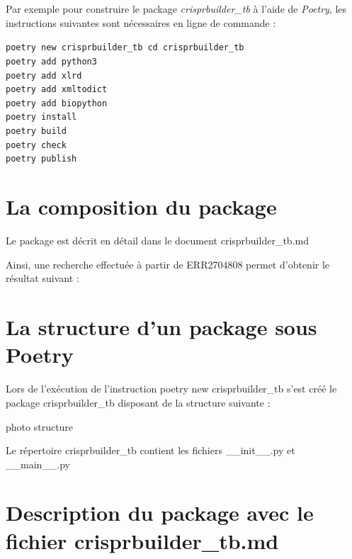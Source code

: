 \documentclass[twoside,a4paper,11pt,frenchb,openany]{report}
\begin{document}
Par exemple pour construire le package \textit{crisprbuilder\_tb} à l'aide de \textit{Poetry}, les instructions suivantes sont nécessaires en ligne de commande :

\begin{tcolorbox}\texttt{poetry new crisprbuilder\_tb
cd crisprbuilder\_tb \\
poetry add python3 \\
poetry add xlrd \\
poetry add xmltodict \\
poetry add biopython \\
poetry install \\
poetry build \\
poetry check \\
poetry publish}\end{tcolorbox}


	
	\section{La composition du package}

Le package est décrit en détail dans le document crisprbuilder\_tb.md


Ainsi, une recherche effectuée à partir de ERR2704808 permet d'obtenir le résultat suivant :


\section{La structure d'un package sous Poetry}

Lors de l'exécution de l'instruction poetry new crisprbuilder\_tb s'est créé le package crisprbuilder\_tb disposant de la structure suivante :

photo structure

Le répertoire crisprbuilder\_tb contient les fichiers \_\_init\_\_.py et \_\_main\_\_.py








\section{Description du package avec le fichier crisprbuilder\_tb.md}
\end{document}
